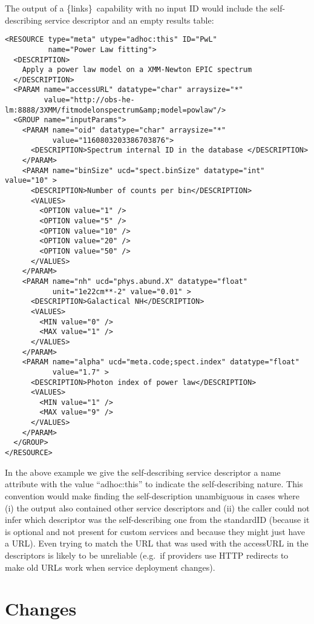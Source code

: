 \documentclass[11pt,a4paper]{ivoa}
\newcommand{\blinks}{\{links\}}
\begin{document}
The output of a \blinks\ capability with no input ID would include the
self-describing service descriptor and an empty results table:
\begin{verbatim}
<RESOURCE type="meta" utype="adhoc:this" ID="PwL"
          name="Power Law fitting">
  <DESCRIPTION>
    Apply a power law model on a XMM-Newton EPIC spectrum
  </DESCRIPTION>
  <PARAM name="accessURL" datatype="char" arraysize="*"
         value="http://obs-he-lm:8888/3XMM/fitmodelonspectrum&amp;model=powlaw"/>
  <GROUP name="inputParams">
    <PARAM name="oid" datatype="char" arraysize="*"
           value="1160803203386703876">
      <DESCRIPTION>Spectrum internal ID in the database </DESCRIPTION>
    </PARAM>
    <PARAM name="binSize" ucd="spect.binSize" datatype="int" value="10" >
      <DESCRIPTION>Number of counts per bin</DESCRIPTION>
      <VALUES>
        <OPTION value="1" />
        <OPTION value="5" />
        <OPTION value="10" />
        <OPTION value="20" />
        <OPTION value="50" />
      </VALUES>
    </PARAM>
    <PARAM name="nh" ucd="phys.abund.X" datatype="float"
           unit="1e22cm**-2" value="0.01" >
      <DESCRIPTION>Galactical NH</DESCRIPTION>
      <VALUES>
        <MIN value="0" />
        <MAX value="1" />
      </VALUES>
    </PARAM>
    <PARAM name="alpha" ucd="meta.code;spect.index" datatype="float"
           value="1.7" >
      <DESCRIPTION>Photon index of power law</DESCRIPTION>
      <VALUES>
        <MIN value="1" />
        <MAX value="9" />
      </VALUES>
    </PARAM>
  </GROUP>
</RESOURCE>
\end{verbatim}

In the above example we give the self-describing service descriptor a
name attribute with the value ``adhoc:this'' to indicate the self-describing
nature. This convention would make finding the self-description
unambiguous in cases where (i) the output also contained other service
descriptors and (ii) the caller could not infer which descriptor was
the self-describing one from the standardID (because it is optional
and not present for custom services and because they might just have a
URL). Even trying to match the URL that was used with the accessURL in
the descriptors is likely to be unreliable (e.g.\ if providers use HTTP
redirects to make old URLs work when service deployment changes).


\section{Changes}
\end{document}
